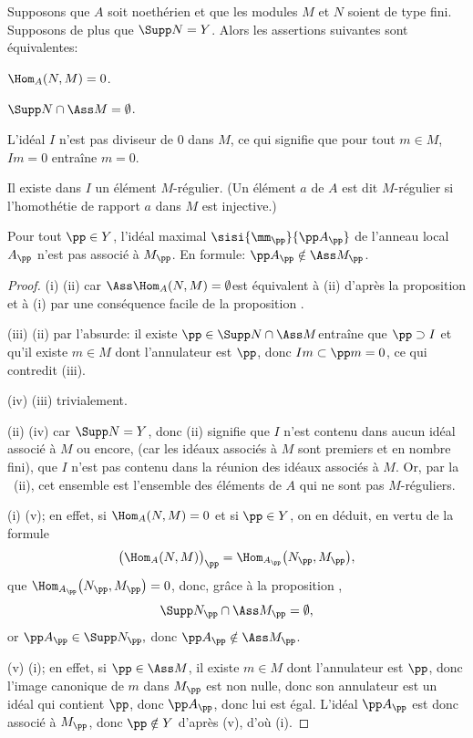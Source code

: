 \begin{lemme} \label{III.2.1}
Supposons que $A$ soit noeth\'erien et que les modules $M$ et $N$ soient de type fini. Supposons de plus que $\Supp N=Y$. Alors les assertions suivantes sont \'equivalentes:
\begin{enumeratei}
\item
$\Hom_A(N, M)=0$.
\item
$\Supp N \cap \Ass M = \emptyset$.
\item
L'id\'eal $I$ n'est pas diviseur de $0$ dans $M$, ce qui signifie que pour tout $m\in M$, $Im=0$ entra\^ine $m=0$.
\item
Il existe dans $I$ un \'el\'ement $M$-r\'egulier. (Un \'el\'ement $a$ de $A$ est dit $M$-r\'egulier si l'homoth\'etie de rapport $a$ dans $M$ est injective.)

\item
Pour tout $\pp \in Y$, l'id\'eal maximal $\sisi{\mm_\pp}{\pp A_\pp}$ de l'anneau local $A_\pp$ n'est pas associ\'e \`a $M_\pp$. En formule: $\pp A_\pp \notin \Ass M_\pp$.
\end{enumeratei}
\end{lemme}

\skpt
\begin{proof}
(i) \SSI (ii) car $\Ass \Hom_A(N, M)=\emptyset$\pageoriginale est \'equivalent \`a (ii) d'apr\`es la proposition  et \`a (i) par une cons\'equence facile de la proposition .

(iii) \ALORS (ii) par l'absurde: \og il existe $\pp \in \Supp N \cap \Ass M$\fg entra\^ine que $\pp \supset I$ et qu'il existe $m\in M$ dont l'annulateur est $\pp $, donc $Im \subset \pp m=0$, ce qui contredit (iii).

(iv) \ALORS (iii) trivialement.

(ii) \SSI (iv) car $\Supp N = Y$, donc (ii) signifie que $I$ n'est contenu dans aucun id\'eal associ\'e \`a $M$ ou encore, (car les id\'eaux associ\'es \`a $M$ sont premiers et en nombre fini), que $I$ n'est pas contenu dans la r\'eunion des id\'eaux associ\'es \`a $M$. Or, par la  ~(ii), cet ensemble est l'ensemble des \'el\'ements de $A$ qui ne sont pas $M$-r\'eguliers.

(i) \ALORS (v); en effet, si $\Hom_A(N, M)=0$ et si $\pp \in Y$, on en d\'eduit, en vertu de la formule
\[
\bigl(\Hom_A(N, M) \bigr)_\pp = \Hom_{A_\pp} \bigl(N_\pp, M_\pp \bigr),
\]
que $\Hom_{A_\pp} \bigl(N_\pp, M_\pp \bigr)=0$, donc, gr\^ace \`a la proposition ,
\[
\Supp N_\pp \cap \Ass M_\pp = \emptyset,
\]
or $\pp A_\pp \in \Supp N_\pp, $ donc $ \pp A_\pp \notin \Ass M_\pp$.

(v) \ALORS (i); en effet, si $\pp \in \Ass M$, il existe $m\in M$ dont l'annulateur est $\pp$, donc l'image canonique de $m$ dans $M_\pp$ est non nulle, donc son annulateur est un id\'eal qui contient $\pp$, donc $\pp A_\pp$, donc lui est \'egal. L'id\'eal $\pp A_\pp$ est donc associ\'e \`a $M_\pp$, donc $\pp \notin Y$ d'apr\`es (v), d'o\`u (i).
\end{proof}

